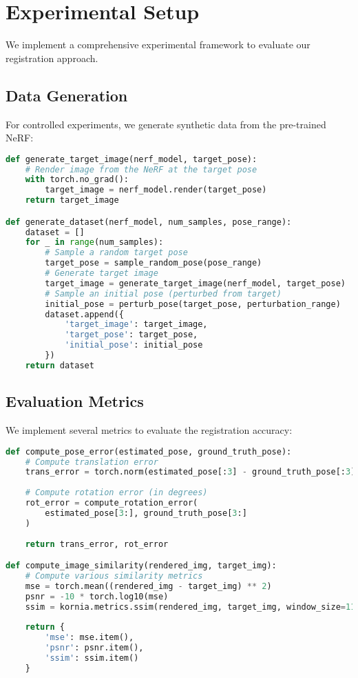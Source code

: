 \section{Experimental Setup}
We implement a comprehensive experimental framework to evaluate our registration approach.

\subsection{Data Generation}
For controlled experiments, we generate synthetic data from the pre-trained NeRF:

\begin{lstlisting}[language=Python]
def generate_target_image(nerf_model, target_pose):
    # Render image from the NeRF at the target pose
    with torch.no_grad():
        target_image = nerf_model.render(target_pose)
    return target_image

def generate_dataset(nerf_model, num_samples, pose_range):
    dataset = []
    for _ in range(num_samples):
        # Sample a random target pose
        target_pose = sample_random_pose(pose_range)
        # Generate target image
        target_image = generate_target_image(nerf_model, target_pose)
        # Sample an initial pose (perturbed from target)
        initial_pose = perturb_pose(target_pose, perturbation_range)
        dataset.append({
            'target_image': target_image,
            'target_pose': target_pose,
            'initial_pose': initial_pose
        })
    return dataset
\end{lstlisting}

\subsection{Evaluation Metrics}
We implement several metrics to evaluate the registration accuracy:

\begin{lstlisting}[language=Python]
def compute_pose_error(estimated_pose, ground_truth_pose):
    # Compute translation error
    trans_error = torch.norm(estimated_pose[:3] - ground_truth_pose[:3])
    
    # Compute rotation error (in degrees)
    rot_error = compute_rotation_error(
        estimated_pose[3:], ground_truth_pose[3:]
    )
    
    return trans_error, rot_error

def compute_image_similarity(rendered_img, target_img):
    # Compute various similarity metrics
    mse = torch.mean((rendered_img - target_img) ** 2)
    psnr = -10 * torch.log10(mse)
    ssim = kornia.metrics.ssim(rendered_img, target_img, window_size=11)
    
    return {
        'mse': mse.item(),
        'psnr': psnr.item(),
        'ssim': ssim.item()
    }
\end{lstlisting}

